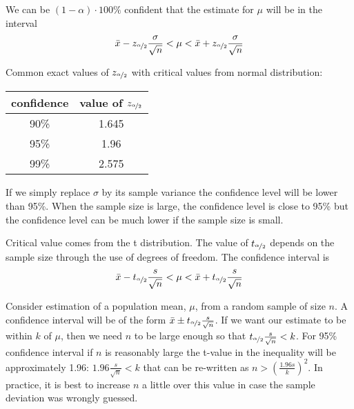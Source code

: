 \begin{definition}
    We can be $(1-\alpha)\cdot 100\%$ confident that the estimate for $\mu$ will be in the interval
    \begin{align}
        \bar{x} - z_{\nicefrac{\alpha}{2}}\frac{\sigma}{\sqrt{n}} < \mu < \bar{x} + z_{\nicefrac{\alpha}{2}}\frac{\sigma}{\sqrt{n}} \notag
    \end{align}
    
    Common exact values of $z_{\nicefrac{\alpha}{2}}$ with critical values from normal distribution:
    \begin{center}
        \begin{tabular}{c|c}
            \textbf{confidence} & \textbf{value of $z_{\nicefrac{\alpha}{2}}$} \\
            \hline
            90\% & 1.645 \\
            95\% & 1.96 \\
            99\% & 2.575 \\
        \end{tabular}
    \end{center}
\end{definition}

\begin{definition}
    If we simply replace $\sigma$ by its sample variance the confidence level will be lower than 95\%. When the sample size is large, the confidence level is close to 95\% but the confidence level can be much lower if the sample size is small. 
    
    Critical value comes from the  t distribution. The value of $t_{\nicefrac{\alpha}{2}}$ depends on the sample size through the use of degrees of freedom. The confidence interval is
    \begin{align}
        \bar{x} - t_{\nicefrac{\alpha}{2}}\frac{s}{\sqrt{n}} < \mu < \bar{x} + t_{\nicefrac{\alpha}{2}}\frac{s}{\sqrt{n}} \notag
    \end{align}
\end{definition}

Consider estimation of a population mean, $\mu$, from a random sample of size $n$. A confidence interval will be of the form $\bar{x}\pm t_{\nicefrac{\alpha}{2}}\frac{s}{\sqrt{n}}$. If we want our estimate to be within $k$ of $\mu$, then we need $n$ to be large enough so that $t_{\nicefrac{\alpha}{2}}\frac{s}{\sqrt{n}} < k$. For 95\% confidence interval if $n$ is reasonably large the t-value in the inequality will be approximately 1.96: $1.96\frac{s}{\sqrt{n}}<k$ that can be re-written as $n>\left(\frac{1.96s}{k}\right)^2$. In practice, it is best to increase $n$ a little over this value in case the sample deviation was wrongly guessed.

